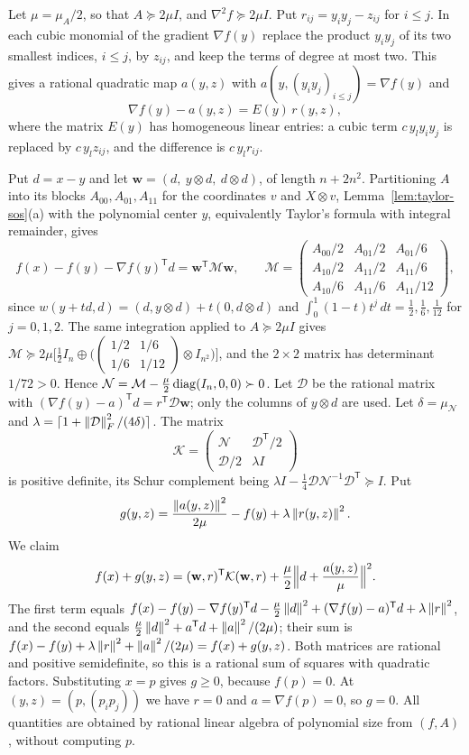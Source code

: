 Let $\mu=\mu_A/2$, so that $A\succeq2\mu I$, and $\nabla^2f\succeq2\mu I$. Put
$r_{ij}=y_iy_j-z_{ij}$ for $i\le j$. In each cubic monomial of the gradient
$\nabla f(y)$ replace the product $y_iy_j$ of its two smallest indices,
$i\le j$, by $z_{ij}$, and keep the terms of degree at most two. This gives a
rational quadratic map $a(y,z)$ with
$a(y,(y_iy_j)_{i\le j})=\nabla f(y)$ and
\[
 \nabla f(y)-a(y,z)=E(y)\,r(y,z),
\]
where the matrix $E(y)$ has homogeneous linear entries: a cubic term
$c\,y_ly_iy_j$ is replaced by $c\,y_lz_{ij}$, and the difference is
$c\,y_lr_{ij}$.

Put $d=x-y$ and let $\mathbf w=(d,\ y\otimes d,\ d\otimes d)$, of length
$n+2n^2$. Partitioning $A$ into its blocks $A_{00},A_{01},A_{11}$ for the
coordinates $v$ and $X\otimes v$, Lemma~\ref{lem:taylor-sos}(a) with the
polynomial center $y$, equivalently Taylor's formula with integral
remainder, gives
\[
 f(x)-f(y)-\nabla f(y)^{\mathsf T}d=\mathbf w^{\mathsf T}\mathcal M\mathbf w,\qquad
 \mathcal M=\begin{pmatrix}
 A_{00}/2&A_{01}/2&A_{01}/6\\
 A_{10}/2&A_{11}/2&A_{11}/6\\
 A_{10}/6&A_{11}/6&A_{11}/12\end{pmatrix},
\]
since $w(y+td,d)=(d,y\otimes d)+t(0,d\otimes d)$ and
$\int_0^1(1-t)t^j\,dt=\frac12,\frac16,\frac1{12}$ for $j=0,1,2$. The same
integration applied to $A\succeq2\mu I$ gives
$\mathcal M\succeq2\mu\bigl[\frac12I_n\oplus
\bigl(\left(\begin{smallmatrix}1/2&1/6\\1/6&1/12\end{smallmatrix}\right)\otimes
I_{n^2}\bigr)\bigr]$, and the $2\times2$ matrix has determinant $1/72>0$.
Hence $\mathcal N=\mathcal M-\frac\mu2\operatorname{diag}(I_n,0,0)\succ0$. Let $\mathcal D$ be
the rational matrix with $(\nabla f(y)-a)^{\mathsf T}d=r^{\mathsf T}\mathcal D\mathbf w$;
only the columns of $y\otimes d$ are used. Let
$\delta=\mu_{\mathcal N}$ and
$\lambda=\lceil1+\left\lVert\mathcal D\right\rVert_F^2/(4\delta)\rceil$. The matrix
\[
 \mathcal K=\begin{pmatrix}\mathcal N&\mathcal D^{\mathsf T}/2\\
   \mathcal D/2&\lambda I\end{pmatrix}
\]
is positive definite, its Schur complement being
$\lambda I-\frac14\mathcal D\mathcal N^{-1}\mathcal D^{\mathsf T}\succeq I$. Put
\[
 g(y,z)=\frac{\left\lVert a(y,z)\right\rVert^2}{2\mu}-f(y)+\lambda\left\lVert r(y,z)\right\rVert^2 .
\]
We claim
\[
 f(x)+g(y,z)=(\mathbf w,r)^{\mathsf T}\mathcal K(\mathbf w,r)
   +\frac\mu2\Bigl\lVert d+\frac{a(y,z)}\mu\Bigr\rVert^2 .
\]
The first term equals $f(x)-f(y)-\nabla f(y)^{\mathsf T}d-\frac\mu2\left\lVert d\right\rVert^2
+(\nabla f(y)-a)^{\mathsf T}d+\lambda\left\lVert r\right\rVert^2$, and the second equals
$\frac\mu2\left\lVert d\right\rVert^2+a^{\mathsf T}d+\left\lVert a\right\rVert^2/(2\mu)$; their sum is
$f(x)-f(y)+\lambda\left\lVert r\right\rVert^2+\left\lVert a\right\rVert^2/(2\mu)=f(x)+g(y,z)$. Both matrices are
rational and positive semidefinite, so this is a rational sum of squares with
quadratic factors. Substituting $x=p$ gives $g\ge0$, because $f(p)=0$. At
$(y,z)=(p,(p_ip_j))$ we have $r=0$ and $a=\nabla f(p)=0$, so $g=0$. All
quantities are obtained by rational linear algebra of polynomial size from
$(f,A)$, without computing $p$.

